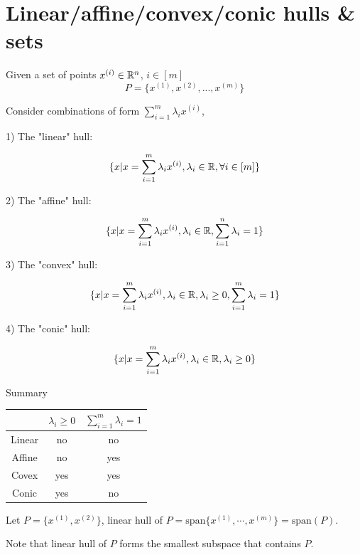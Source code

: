 
\section{Linear/affine/convex/conic hulls \& sets}
Given a set of points $x^{(i)} \in \mathbb{R}^n$, $i\in [m]$
\begin{equation*}
P = \{x^{(1)}, x^{(2)},..., x^{(m)} \}
\end{equation*}

Consider combinations of form $\sum^m_{i=1} \lambda_i x^{(i)}$,

1) The "linear" hull: 

\begin{equation*}
\{x|x = \sum^m_{i=1} \lambda_i x^{(i)}, \lambda_i\in \mathbb{R}, \forall i\in [m] \}
\end{equation*}

2) The "affine" hull: 

\begin{equation*}
\{x|x = \sum^m_{i=1} \lambda_i x^{(i)}, \lambda_i\in \mathbb{R}, \sum^n_{i=1}\lambda_i = 1 \}
\end{equation*}


3) The "convex" hull: 

\begin{equation*}
\{x|x = \sum^m_{i=1} \lambda_i x^{(i)}, \lambda_i\in \mathbb{R}, \lambda_i \geq 0, \sum^m_{i=1}\lambda_i = 1 \}
\end{equation*}


4) The "conic" hull: 

\begin{equation*}
\{x|x = \sum^m_{i=1} \lambda_i x^{(i)}, \lambda_i\in \mathbb{R}, \lambda_i \geq 0 \}
\end{equation*}

Summary
\begin{center}
	\begin{tabular}{|c|c|c|}
	\hline  
   & $\lambda_i \geq 0$   & $\sum^m_{i=1}\lambda_i = 1$ \\
	\hline  
Linear&  no  & no \\
	\hline  
Affine&  no  &yes  \\
	\hline 
Covex&  yes  & yes \\
	\hline  
Conic&  yes  &  no\\
	\hline 
\end{tabular}
\end{center}


\begin{example}
	
Let $P = \{x^{(1)}, x^{(2)} \}$, linear hull of $P = \text{span}\{x^{(1)},\cdots,x^{(m)} \} =\text{span}(P)$.

Note that linear hull of $P$ forms the smallest subspace that contains $P$.

\end{example}

